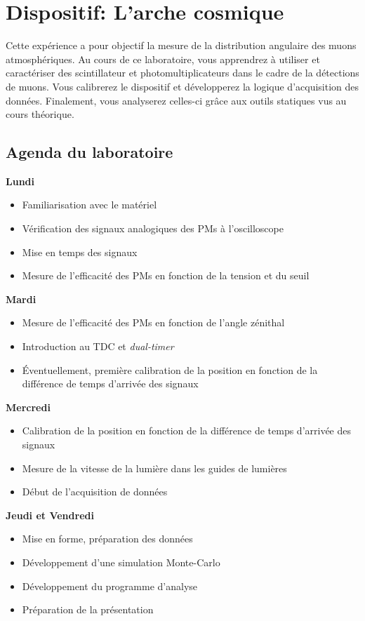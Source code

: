 \section{Dispositif: L'arche cosmique}
\label{sect:Muon_arche}

Cette expérience a pour objectif la mesure de la distribution angulaire des muons atmosphériques.
Au cours de ce laboratoire, vous apprendrez à utiliser et caractériser des scintillateur et photomultiplicateurs dans le cadre de la détections de muons.
Vous calibrerez le dispositif et développerez la logique d'acquisition des données.
Finalement, vous analyserez celles-ci grâce aux outils statiques vus au cours théorique.

\subsection{Agenda du laboratoire}

\textbf{Lundi}
\begin{itemize}
    \item Familiarisation avec le matériel
    \item Vérification des signaux analogiques des PMs à l'oscilloscope
    \item Mise en temps des signaux
    \item Mesure de l'efficacité des PMs en fonction de la tension et du seuil
\end{itemize}
\vspace{\baselineskip}
\textbf{Mardi}
\begin{itemize}
    \item Mesure de l'efficacité des PMs en fonction de l'angle zénithal
    \item Introduction au TDC et \textit{dual-timer}
    \item Éventuellement, première calibration de la position en fonction de la différence de temps d'arrivée des signaux
\end{itemize}
\vspace{\baselineskip}
\textbf{Mercredi}
\begin{itemize}
    \item Calibration de la position en fonction de la différence de temps d'arrivée des signaux
    \item Mesure de la vitesse de la lumière dans les guides de lumières
    \item Début de l'acquisition de données
\end{itemize}
\vspace{\baselineskip}
\textbf{Jeudi et Vendredi}
\begin{itemize}
    \item Mise en forme, préparation des données
    \item Développement d'une simulation Monte-Carlo
    \item Développement du programme d'analyse
    \item Préparation de la présentation
\end{itemize}

